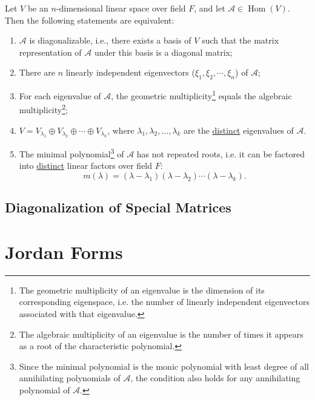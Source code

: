 \documentclass[11pt]{../../TexTemplate/elegantbook} %
\begin{document}
\begin{theorem}
    Let \( V \) be an \( n \)-dimensional linear space over field \( F \),
    and let \( \mathcal{A}\in \operatorname{Hom}(V) \).
    Then the following statements are equivalent:
    \begin{enumerate}
        \item \( \mathcal{A} \) is diagonalizable, i.e., there exists a basis of \( V \)
            such that the matrix representation of \( \mathcal{A} \) under this basis is a diagonal matrix;
        \item There are \( n \) linearly independent eigenvectors (\( \xi_{1}, \xi_{2}, \cdots, \xi_{n} \)) of \( \mathcal{A} \);
        \item For each eigenvalue of \( \mathcal{A} \), the geometric multiplicity\footnote{
            The geometric multiplicity of an eigenvalue is the dimension of its corresponding eigenspace,
            i.e. the number of linearly independent eigenvectors associated with that eigenvalue.
        } equals the algebraic multiplicity\footnote{
            The algebraic multiplicity of an eigenvalue is 
            the number of times it appears as a root of the characteristic polynomial.
        };
        \item \( V = V_{\lambda_1} \oplus V_{\lambda_2} \oplus \cdots \oplus V_{\lambda_k} \),
            where \( \lambda_1, \lambda_2, \dots, \lambda_k \) are the \underline{distinct} eigenvalues of \( \mathcal{A} \).
        \item The minimal polynomial\footnote{
            Since the minimal polynomial is the monic polynomial with least degree 
            of all annihilating polynomials of \( \mathcal{A} \),
            the condition also holds for any annihilating polynomial of \( \mathcal{A} \).
        } of \( \mathcal{A} \) has not repeated roots, 
            i.e. it can be factored into \underline{distinct} linear factors over field \( F \):
            \[
            m(\lambda) = (\lambda - \lambda_1)(\lambda - \lambda_2) \cdots (\lambda - \lambda_k).
            \]
    \end{enumerate}
\end{theorem}

\section{Diagonalization of Special Matrices}


\chapter{Jordan Forms}
\end{document}
